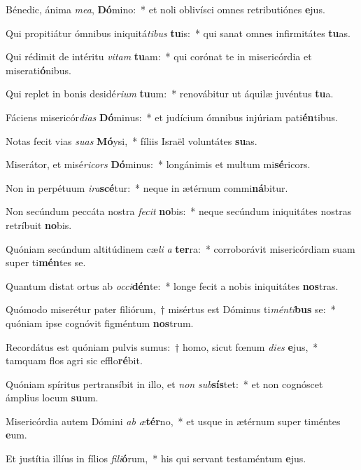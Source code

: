 \item Bénedic, ánima \textit{me}\textit{a}, \textbf{Dó}mino:~* et noli oblivísci omnes retributiónes \textbf{e}jus.
\item Qui propitiátur ómnibus iniquitá\textit{ti}\textit{bus} \textbf{tu}is:~* qui sanat omnes infirmitátes \textbf{tu}as.
\item Qui rédimit de intéritu \textit{vi}\textit{tam} \textbf{tu}am:~* qui corónat te in misericórdia et miserati\textbf{ó}nibus.
\item Qui replet in bonis desidé\textit{ri}\textit{um} \textbf{tu}um:~* renovábitur ut áquilæ juvéntus \textbf{tu}a.
\item Fáciens misericór\textit{di}\textit{as} \textbf{Dó}minus:~* et judícium ómnibus injúriam pati\textbf{én}tibus.
\item Notas fecit vias \textit{su}\textit{as} \textbf{Mó}ysi,~* fíliis Israël voluntátes \textbf{su}as.
\item Miserátor, et misé\textit{ri}\textit{cors} \textbf{Dó}minus:~* longánimis et multum mi\textbf{sé}ricors.
\item Non in perpétuum \textit{i}\textit{ra}\textbf{scé}tur:~* neque in ætérnum commi\textbf{ná}bitur.
\item Non secúndum peccáta nostra \textit{fe}\textit{cit} \textbf{no}bis:~* neque secúndum iniquitátes nostras retríbuit \textbf{no}bis.
\item Quóniam secúndum altitúdinem cæ\textit{li} \textit{a} \textbf{ter}ra:~* corroborávit misericórdiam suam super ti\textbf{mén}tes se.
\item Quantum distat ortus ab \textit{oc}\textit{ci}\textbf{dén}te:~* longe fecit a nobis iniquitátes \textbf{nos}tras.
\item Quómodo miserétur pater filiórum,~† misértus est Dóminus ti\textit{mén}\textit{ti}\textbf{bus} se:~* quóniam ipse cognóvit figméntum \textbf{nos}trum.
\item Recordátus est quóniam pulvis sumus:~† homo, sicut fœnum \textit{di}\textit{es} \textbf{e}jus,~* tamquam flos agri sic efflo\textbf{ré}bit.
\item Quóniam spíritus pertransíbit in illo, et \textit{non} \textit{sub}\textbf{sís}tet:~* et non cognóscet ámplius locum \textbf{su}um.
\item Misericórdia autem Dómini \textit{ab} \textit{æ}\textbf{tér}no,~* et usque in ætérnum super timéntes \textbf{e}um.
\item Et justítia illíus in fílios \textit{fi}\textit{li}\textbf{ó}rum,~* his qui servant testaméntum \textbf{e}jus.
